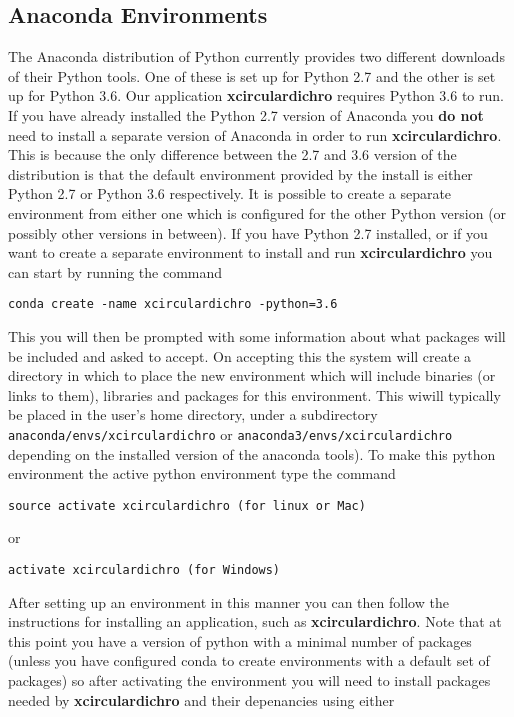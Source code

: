 \documentclass[12pt,letterpaper, openany]{book}
\begin{document}
\begin{appendices}
\section{Anaconda Environments}
The Anaconda distribution of Python currently provides two different 
downloads of their Python tools.  One of these is set up for Python 2.7 
and the other is set up for Python 3.6.  Our application
\textbf{xcirculardichro} requires Python 3.6 to run.  If you have already installed the Python 2.7 
version of Anaconda you \textbf{do not} need to install a separate version 
of Anaconda in order to run \textbf{xcirculardichro}.  This is because the
only difference between the 2.7 and 3.6 version of the distribution is that
the default environment provided by the install is either Python 2.7 or 
Python 3.6 respectively.  It is possible to create a separate environment
from either one which is configured for the other Python version (or possibly 
other versions in between).  If you have Python 2.7 installed, or if 
you want to create a separate environment to install and run
\textbf{xcirculardichro} you can start by running the command
\lstset{language=bash}
\begin{lstlisting}
conda create -name xcirculardichro -python=3.6
\end{lstlisting}
This you will then be prompted with some information about what packages
will be included and asked to accept.  On accepting this the system will 
create a directory in which to place the new environment which will include 
binaries (or links to them), libraries and packages for this environment. This
wiwill typically be placed in the user's home directory, under a subdirectory
\texttt{anaconda/envs/xcirculardichro} or
\texttt{anaconda3/envs/xcirculardichro}  depending on the installed version of
the anaconda tools).  To make this python environment the active python 
environment type the command

\lstset{language=bash}
\begin{lstlisting}
source activate xcirculardichro (for linux or Mac)
\end{lstlisting}

or

\lstset{language=bash}
\begin{lstlisting}
activate xcirculardichro (for Windows)
\end{lstlisting}

After setting up an environment in this manner you can then follow the
instructions for installing an application, such as \textbf{xcirculardichro}. 
Note that at this point you have a version of python with a minimal number of
packages (unless you have configured conda to create environments with a
default set of packages) so after activating the environment you will need to
install packages needed by \textbf{xcirculardichro} and their depenancies using 
either 


\end{appendices}
\end{document}
